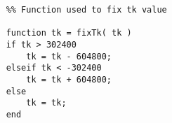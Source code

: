 
\begin{verbatim}
	%% Function used to fix tk value

	function tk = fixTk( tk )
	if tk > 302400
	    tk = tk - 604800;
	elseif tk < -302400
	    tk = tk + 604800;
	else
	    tk = tk;
	end
\end{verbatim}
